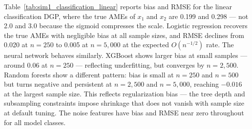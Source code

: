 \documentclass[conference]{IEEEtran}
\begin{document}
	Table~\ref{tab:sim1_classification_linear} reports bias and RMSE for the linear classification DGP, where the true AMEs of $x_1$ and $x_2$ are 0.199 and 0.298 --- not 2.0 and 3.0 because the sigmoid compresses the scale. Logistic regression recovers the true AMEs with negligible bias at all sample sizes, and RMSE declines from 0.020 at $n=250$ to 0.005 at $n=5{,}000$ at the expected $O(n^{-1/2})$ rate. The neural network behaves similarly. XGBoost shows larger bias at small samples --- around 0.06 at $n=250$ --- reflecting underfitting, but converges by $n=2{,}500$. Random forests show a different pattern: bias is small at $n=250$ and $n=500$ but turns negative and persistent at $n=2{,}500$ and $n=5{,}000$, reaching $-0.016$ at the largest sample size. This reflects regularization bias --- the tree depth and subsampling constraints impose shrinkage that does not vanish with sample size at default tuning. The noise features have bias and RMSE near zero throughout for all model classes.
	
\end{document}
